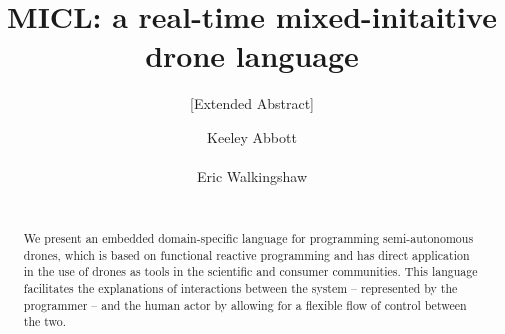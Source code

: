 \documentclass{sig-alternate-05-2015}
\begin{document}




\title{MICL: a real-time mixed-initaitive drone language}
\subtitle{[Extended Abstract]}

\author{
\alignauthor
Keeley Abbott\\
\\
\alignauthor
Eric Walkingshaw\\
\\
}

\maketitle
\begin{abstract}
We present an embedded domain-specific language for programming
semi-autonomous drones, which is based on functional reactive programming and
has direct application in the use of drones as tools in the scientific and
consumer communities. This language facilitates the explanations of
interactions between the system -- represented by the programmer -- and the
human actor by allowing for a flexible flow of control between the two.
\end{abstract}
\end{document}
